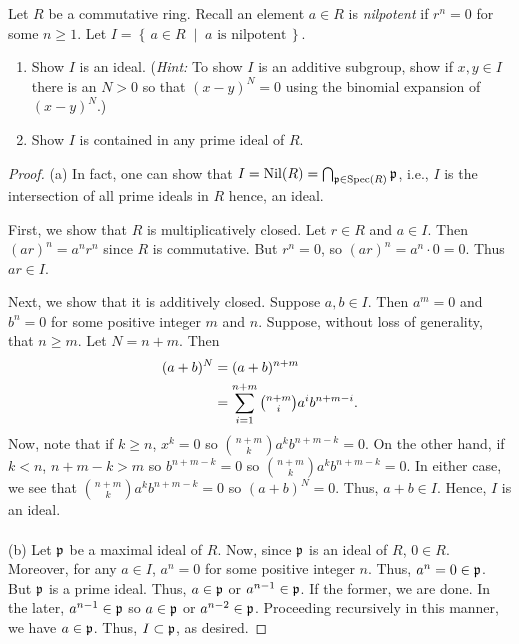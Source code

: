 \begin{problem}
Let $R$ be a commutative ring. Recall an element $a\in R$ is
\emph{nilpotent} if $r^n=0$ for some $n\geq 1$. Let $I=\left\{\,a\in
  R\;\middle|\;\text{$a$ is nilpotent}\,\right\}$.
\begin{enumerate}[label=(\alph*)]
\item Show $I$ is an ideal. (\emph{Hint:} To show $I$ is an additive
  subgroup, show if $x,y\in I$ there is an $N>0$ so that $(x-y)^N=0$ using
  the binomial expansion of $(x-y)^N$.)
\item Show $I$ is contained in any prime ideal of $R$.
\end{enumerate}
\end{problem}
\begin{proof}
(a) In fact, one can show that $I=\operatorname{Nil}(R)=\bigcap_{\mathfrak{p}\in\operatorname{Spec}(R)}\mathfrak{p}$,
i.e., $I$ is the intersection of all prime ideals in $R$ hence, an ideal.

First, we show that $R$ is multiplicatively closed. Let $r\in R$ and $a\in
I$. Then $(ar)^n=a^nr^n$ since $R$ is commutative. But $r^n=0$, so
$(ar)^n=a^n\cdot 0=0$. Thus $ar\in I$.

Next, we show that it is additively closed. Suppose $a,b\in I$. Then
$a^m=0$ and $b^n=0$ for some positive integer $m$ and $n$. Suppose, without
loss of generality, that $n\geq m$. Let $N=n+m$. Then
\begin{align*}
(a+b)^N&=(a+b)^{n+m}\\
       &=\sum_{i=1}^{n+m}\tbinom{n+m}{i}a^ib^{n+m-i}.
\end{align*}
Now, note that if $k\geq n$, $x^k=0$ so $\binom{n+m}{k}a^kb^{n+m-k}=0$. On
the other hand, if $k<n$, $n+m-k>m$ so $b^{n+m-k}=0$ so
$\binom{n+m}{k}a^kb^{n+m-k}=0$. In either case, we see that
$\binom{n+m}{k}a^kb^{n+m-k}=0$ so $(a+b)^N=0$. Thus, $a+b\in I$. Hence,
$I$ is an ideal.
\\\\
(b) Let $\mathfrak{p}$ be a maximal ideal of $R$. Now, since $\mathfrak{p}$ is an ideal
of $R$, $0\in R$. Moreover, for any $a\in I$, $a^n=0$ for some positive
integer $n$. Thus, $a^n=0\in\mathfrak{p}$. But $\mathfrak{p}$ is a prime ideal. Thus,
$a\in\mathfrak{p}$ or $a^{n-1}\in\mathfrak{p}$. If the former, we are done. In the
later, $a^{n-1}\in\mathfrak{p}$ so $a\in\mathfrak{p}$ or $a^{n-2}\in\mathfrak{p}$. Proceeding
recursively in this manner, we have $a\in\mathfrak{p}$. Thus, $I\subset\mathfrak{p}$,
as desired.
\end{proof}

